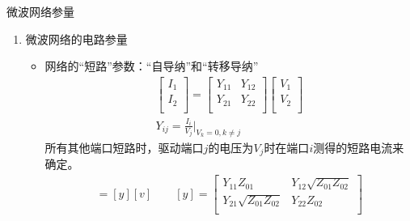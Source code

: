\begin{frame}{微波网络参量}
    \begin{enumerate}
        \item 微波网络的电路参量
              \begin{itemize}
                  \item 网络的“短路”参数：“自导纳”和“转移导纳”
                        \begin{gather*}
                            \begin{bmatrix*}
                                I_1\\
                                I_2\\
                            \end{bmatrix*}
                            =
                            \begin{bmatrix*}
                                Y_{11} & Y_{12}\\
                                Y_{21} & Y_{22}\\
                            \end{bmatrix*}
                            \begin{bmatrix*}
                                V_1 \\
                                V_2 \\
                            \end{bmatrix*}\\
                            Y_{ij}=\frac{I_i}{V_j}\bigg|_{V_k=0,k\neq j}
                        \end{gather*}
                        所有其他端口短路时，驱动端口$j$的电压为$V_j$时在端口$i$测得的短路电流来确定。
                        \begin{gather*}
                            [i]=[y][v] \qquad
                            [y]=
                            \begin{bmatrix*}
                                Y_{11}Z_{01} & Y_{12}\sqrt{Z_{01}Z_{02}} \\
                                Y_{21}\sqrt{Z_{01}Z_{02}} & Y_{22}Z_{02} \\
                            \end{bmatrix*}
                        \end{gather*}
              \end{itemize}
    \end{enumerate}
\end{frame}

